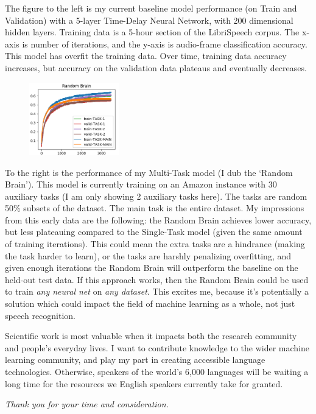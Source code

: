 \documentclass[12pt,a4paper]{article}
\begin{document}
The figure to the left is my current baseline model performance (on Train and Validation) with a 5-layer Time-Delay Neural Network, with 200 dimensional hidden layers. Training data is a 5-hour section of the LibriSpeech corpus. The x-axis is number of iterations, and the y-axis is audio-frame classification accuracy. This model has overfit the training data. Over time, training data accuracy increases, but accuracy on the validation data plateaus and eventually decreases. 


\begin{figure}
  \centering
  \includegraphics[width=0.35\textwidth]{figs/mtl.png}
\end{figure}

To the right is the performance of my Multi-Task model (I dub the `Random Brain'). This model is currently training on an Amazon instance with 30 auxiliary tasks (I am only showing 2 auxiliary tasks here). The tasks are random 50\% subsets of the dataset. The main task is the entire dataset. My impressions from this early data are the following: the Random Brain achieves lower accuracy, but less plateauing compared to the Single-Task model (given the same amount of training iterations). This could mean the extra tasks are a hindrance (making the task harder to learn), or the tasks are harshly penalizing overfitting, and given enough iterations the Random Brain will outperform the baseline on the held-out test data. If this approach works, then the Random Brain could be used to train \textit{any neural net} on \textit{any dataset}. This excites me, because it's potentially a solution which could impact the field of machine learning as a whole, not just speech recognition.

Scientific work is most valuable when it impacts both the research community and people's everyday lives. I want to contribute knowledge to the wider machine learning community, and play my part in creating accessible language technologies. Otherwise, speakers of the world's 6,000 languages will be waiting a long time for the resources we English speakers currently take for granted.

\begin{center}
  \textit{Thank you for your time and consideration.}
  \end{center}
\end{document}
